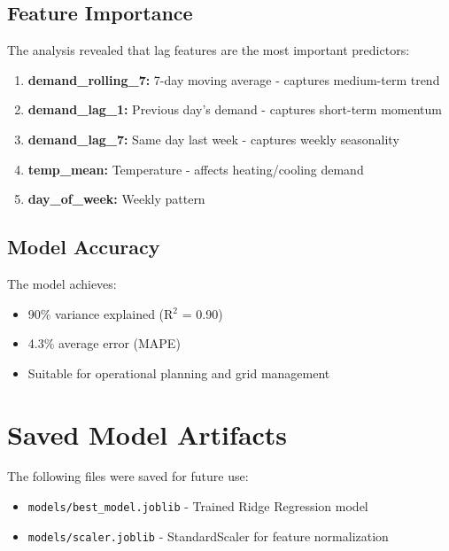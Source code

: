        \subsection{Feature Importance}
        The analysis revealed that lag features are the most important predictors:
        \begin{enumerate}
            \item \textbf{demand\_rolling\_7:} 7-day moving average - captures medium-term trend
            \item \textbf{demand\_lag\_1:} Previous day's demand - captures short-term momentum
            \item \textbf{demand\_lag\_7:} Same day last week - captures weekly seasonality
            \item \textbf{temp\_mean:} Temperature - affects heating/cooling demand
            \item \textbf{day\_of\_week:} Weekly pattern
        \end{enumerate}

        \subsection{Model Accuracy}
        The model achieves:
        \begin{itemize}
            \item 90\% variance explained (R$^2$ = 0.90)
            \item 4.3\% average error (MAPE)
            \item Suitable for operational planning and grid management
        \end{itemize}

        \section{Saved Model Artifacts}
        The following files were saved for future use:
        \begin{itemize}
            \item \texttt{models/best\_model.joblib} - Trained Ridge Regression model
            \item \texttt{models/scaler.joblib} - StandardScaler for feature normalization
        \end{itemize}